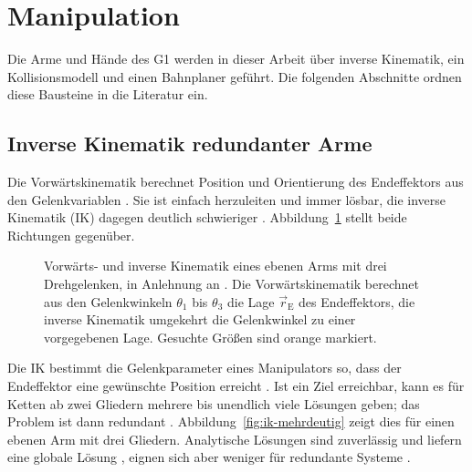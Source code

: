 
\section{Manipulation}
\label{sec:manipulation_sdt}
Die Arme und Hände des G1 werden in dieser Arbeit über inverse Kinematik, ein Kollisionsmodell und einen Bahnplaner geführt.
Die folgenden Abschnitte ordnen diese Bausteine in die Literatur ein.

\subsection{Inverse Kinematik redundanter Arme}
\label{sec:ik}
Die Vorwärtskinematik berechnet Position und Orientierung des Endeffektors aus den Gelenkvariablen \cite{Kucuk2006}.
Sie ist einfach herzuleiten und immer lösbar, die inverse Kinematik (IK) dagegen deutlich schwieriger \cite{Kucuk2006}.
Abbildung~\ref{fig:ik} stellt beide Richtungen gegenüber.

\begin{figure}[htbp]
  \centering
  
  \caption[Vorwärts- und inverse Kinematik eines ebenen Arms]{Vorwärts- und inverse Kinematik eines ebenen Arms mit drei Drehgelenken, in Anlehnung an \cite{Kucuk2006}\ev{*}. Die Vorwärtskinematik berechnet aus den Gelenkwinkeln $\theta_1$ bis $\theta_3$ die Lage $\vec{r}_\mathrm{E}$ des Endeffektors, die inverse Kinematik umgekehrt die Gelenkwinkel zu einer vorgegebenen Lage. Gesuchte Größen sind orange markiert.}
  \label{fig:ik}
\end{figure}

Die IK bestimmt die Gelenkparameter eines Manipulators so, dass der Endeffektor eine gewünschte Position erreicht \cite{Aristidou2018}.
Ist ein Ziel erreichbar, kann es für Ketten ab zwei Gliedern mehrere bis unendlich viele Lösungen geben; das Problem ist dann redundant \cite{Aristidou2018}.
Abbildung~\ref{fig:ik-mehrdeutig} zeigt dies für einen ebenen Arm mit drei Gliedern.
Analytische Lösungen sind zuverlässig und liefern eine globale Lösung \cite{Aristidou2018}, eignen sich aber weniger für redundante Systeme \cite{Aristidou2018}.

